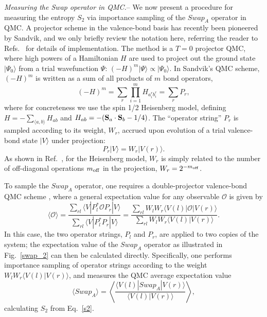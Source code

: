 \documentclass[prl,aps,twocolumn,floatfix,amsmath,amssymb,superscriptaddress,tightenlines]{revtex4}
\begin{document}
{\it Measuring the Swap operator in QMC.}--
We now present a procedure for measuring the entropy $S_2$ via importance sampling of the $Swap_A$ operator in QMC.  A
projector scheme in the valence-bond basis has recently been pioneered by Sandvik, and we only briefly
review the notation here, referring the reader to Refs.~\cite{Sandvik,Beach,AWSloop} for details of implementation.
The method is a $T=0$ projector QMC, where high powers of
a Hamiltonian $H$ are used to project out the ground state $|\Psi_0\rangle$ from a trial wavefunction $\Psi$:
$(-H)^m|\Psi \rangle \propto |\Psi_0\rangle$.  In Sandvik's QMC scheme, $(-H)^m$ is written as a sum of all products of $m$ bond
operators,
\begin{equation}
(-H)^m = \sum_r \prod_{i=1}^m H_{a_i^r b_i^r} = \sum_r P_r,
\end{equation}
where for concreteness we use the spin 1/2 Heisenberg model, defining $H=-\sum_{\langle a,b \rangle}H_{ab}$ and 
$H_{ab} = -({\bf S}_a \cdot {\bf S}_b - 1/4)$.  The ``operator string'' $P_r$ is sampled according to its weight, $W_r$, accrued upon
evolution of a trial valence-bond state $|V \rangle$ under projection:
\begin{equation}
P_r |V \rangle = W_r |V(r) \rangle.
\end{equation} 
As shown in Ref.~\cite{Sandvik}, for the Heisenberg model, $W_r$ is simply related to the number of off-diagonal 
operations $m_{\rm off}$ in the projection, $W_r = 2^{-m_{\rm off}}$.

To sample the $Swap_A$ operator, one requires a double-projector valence-bond QMC scheme \cite{Sandvik}, where
a general expectation value for any observable $\mathcal{O}$ is given by
\begin{equation}
\label{expect}
\langle \mathcal{O} \rangle = \frac{\sum_{rl} \langle V | P_l^* \mathcal{O} P_r | V \rangle} {\sum_{rl} \langle V | P_l^* P_r | V \rangle} 
= \frac{\sum_{rl} W_l W_r \langle V(l) | \mathcal{O} | V(r) \rangle} {\sum_{rl} W_l W_r \langle V(l) | V(r) \rangle}.
\end{equation} 
In this case, the two operator strings, $P_l$ and $P_r$, are applied to two copies of the system; 
the expectation value of the $Swap_A$ operator as illustrated in Fig.~\ref{swap_2} 
can then be calculated directly.  Specifically, one 
performs importance sampling of operator strings according to the weight $W_l W_r \langle V(l) | V(r) \rangle$, and measures
the QMC average expectation value
\begin{equation}
\langle Swap_A \rangle =  \left\langle{ \frac{ \langle V(l) | Swap_A | V(r) \rangle}{\langle V(l) | V(r) \rangle}  }\right\rangle,
\label{Swap}
\end{equation}
calculating $S_2$ from Eq.~\eqref{s2}.
\end{document}
